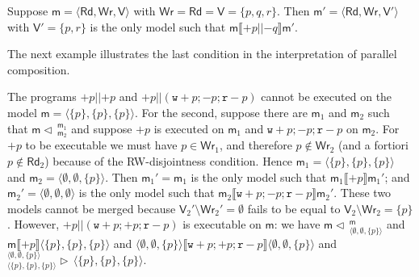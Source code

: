 \documentclass{llncs}
\newcommand{\modl}{\mathsf m}
\newcommand{\mrg}[3]{ ^{#2}_{#3} \triangleright \, #1 }
\newcommand{\pll}{ {||} }							%
\newcommand{\splt}[3]{ #1 \triangleleft \, ^{#2}_{#3} }
\newcommand{\readset}{\mathsf{Rd}}
\newcommand{\valuset}{\mathsf{V}}
\newcommand{\writeset}{\mathsf{Wr}}
\newcommand{\assgnbotR}[1]{{\mathtt r {-} #1}}
\newcommand{\assgntopW}[1]{{\mathtt w {+} #1}}
\newcommand{\assgnbotW}[1]{{\mathtt w {-} #1}}
\newcommand{\assgntopV}[1]{{\mathtt {+} #1}}
\newcommand{\assgnbotV}[1]{{\mathtt {-} #1}}
\newcommand{\intPgm}[1]{\llbracket #1 \rrbracket}
\newcommand{\tuple}[1]{ \langle #1 \rangle}
\begin{document}
\begin{example}
Suppose  
$\modl = \tuple{\readset,\writeset,\valuset}$ with $\writeset = \readset = \valuset = \{ p, q, r \}$. Then
$\modl' = \tuple{\readset,\writeset,\valuset'}$ with $\valuset' = \{ p, r\}$ is the only model such that 
$\modl \intPgm{  \assgntopV{p} \pll \assgnbotV{q} } \modl' $. 
\end{example}

The next example illustrates the last condition in the interpretation of parallel composition.

\begin{example}
The programs 
$\assgntopV p \pll \assgntopV p $ and
$\assgntopV p \pll (\assgntopW p ; \assgnbotV p ; \assgnbotR p ) $
cannot be executed on the model $\modl = \tuple{ \{p\}, \{p\}, \{p\} }$. 
For the second, suppose there are $\modl_1$ and $\modl_2$ such that $\splt{\modl}{\modl_1} {\modl_2}$ and 
suppose $\assgntopV p$ is executed on $\modl_1$ and 
$\assgntopW p ; \assgnbotV p ; \assgnbotR p$ on $\modl_2$.
For $\assgntopV p$ to be executable we must have $p \in \writeset_1$, and therefore
$p \notin \writeset_2$ (and a fortiori $p \notin \readset_2$) because of the RW-disjointness condition. 
Hence $\modl_1 = \tuple{ \{p\}, \{p\}, \{p\} }$ and $\modl_2 = \tuple{ \emptyset, \emptyset, \{p\} }$.
Then 
$\modl_1' = \modl_1$ is the only model such that $\modl_1 \intPgm{ \assgntopV p } \modl_1' $; and 
$\modl_2' = \tuple{ \emptyset, \emptyset, \emptyset }$ is the only model such that $\modl_2 \intPgm{ \assgntopW p ; \assgnbotV p ; \assgnbotR p } \modl_2' $.
These two models cannot be merged because 
$\valuset_2' \setminus \writeset_2' %
= \emptyset$ 
fails to be equal to 
$\valuset_2 \setminus \writeset_2 = \{p\}$. 
%
However, $\assgntopV p \pll ( \assgntopW p ; \assgntopV p ; \assgnbotR p )$
is executable on $\modl$: we have
$\splt{\modl}{\modl}{\tuple{\emptyset,\emptyset,\{p\}}}$ and 
$\modl \intPgm{\assgntopV p} \tuple{\{p\},\{p\},\{p\}}$ and
$\tuple{\emptyset,\emptyset,\{p\}} \intPgm{ \assgntopW p ; \assgntopV p ; \assgnbotR p } \tuple{\emptyset,\emptyset,\{p\} } $ and
$\mrg
{ \tuple{\{p\},\{p\},\{p\}} }
{ \tuple{\emptyset,\emptyset,\{p\}} }
{ \tuple{\{p\},\{p\},\{p\}} }$.
\end{example}
\end{document}
